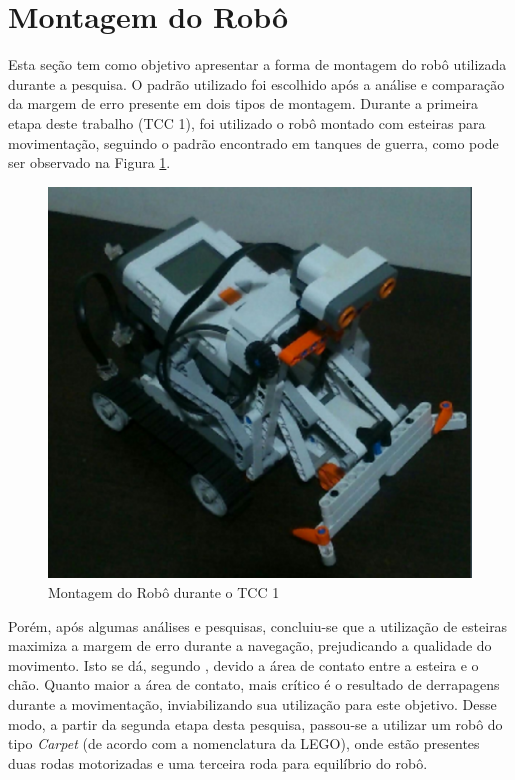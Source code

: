 \section{Montagem do Robô}
\label{sec:montagem_robo}

	Esta seção tem como objetivo apresentar a forma de montagem do robô utilizada durante a pesquisa. O padrão utilizado foi escolhido após a análise e comparação da margem de erro presente em dois tipos de montagem. Durante a primeira etapa deste trabalho (TCC 1), foi utilizado o robô montado com esteiras para movimentação, seguindo o padrão encontrado em tanques de guerra, como pode ser observado na Figura \ref{img:montagem_antiga}.

	\begin{figure}[H]
		\centering
		\includegraphics[scale=0.6]{figuras/montagem_antiga.eps}
		\caption[Montagem do Robô 1]{Montagem do Robô durante o TCC 1}
		\label{img:montagem_antiga}
	\end{figure}

	Porém, após algumas análises e pesquisas, concluiu-se que a utilização de esteiras maximiza a margem de erro durante a navegação, prejudicando a qualidade do movimento. Isto se dá, segundo \cite{legonxj}, devido a área de contato entre a esteira e o chão. Quanto maior a área de contato, mais crítico é o resultado de derrapagens durante a movimentação, inviabilizando sua utilização para este objetivo. Desse modo, a partir da segunda etapa desta pesquisa, passou-se a utilizar um robô do tipo \textit{Carpet} (de acordo com a nomenclatura da LEGO), onde estão presentes duas rodas motorizadas e uma terceira roda para equilíbrio do robô.

